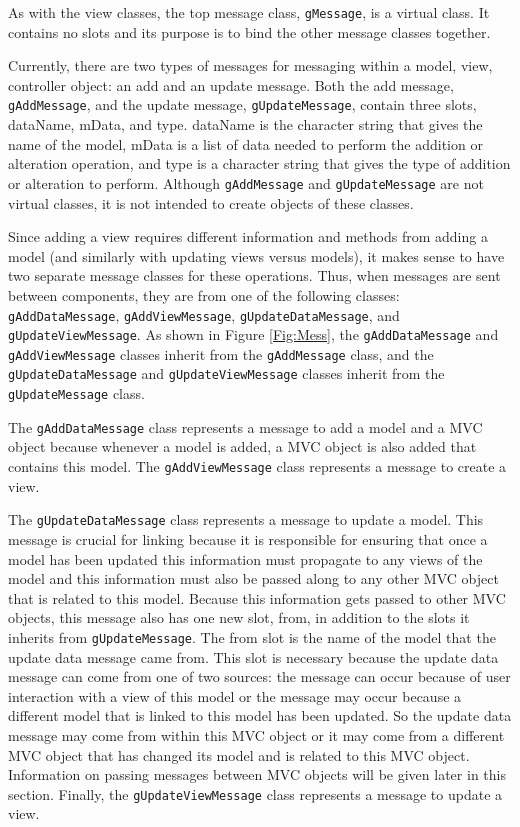 \documentclass[11pt]{article}
\newcommand{\Robject}[1]{{\texttt{#1}}}
\begin{document}
As with the view classes, the top message class, \Robject{gMessage}, is a
virtual class.  It contains no slots and its purpose is to bind the other
message classes together.

Currently, there are two types of messages for messaging within a model, view,
controller object: an add and an update message.  Both the add message,
\Robject{gAddMessage}, and the update message, \Robject{gUpdateMessage},
contain three slots, dataName, mData, and type.  dataName is the character
string that gives the name of the model, mData is a list of data needed to
perform the addition or alteration operation, and type is a character string
that gives the type of addition or alteration to perform.  Although
\Robject{gAddMessage} and \Robject{gUpdateMessage} are not virtual classes, it
is not intended to create objects of these classes.

Since adding a view requires different information and methods from adding a
model (and similarly with updating views versus models), it makes sense to
have two separate message classes for these operations.  Thus, when messages
are sent between components, they are from one of the following classes:
\Robject{gAddDataMessage}, \Robject{gAddViewMessage},
\Robject{gUpdateDataMessage}, and \Robject{gUpdateViewMessage}.  As shown in
Figure \ref{Fig:Mess}, the \Robject{gAddDataMessage} and
\Robject{gAddViewMessage} classes inherit from the \Robject{gAddMessage}
class, and the \Robject{gUpdateDataMessage} and \Robject{gUpdateViewMessage}
classes inherit from the \Robject{gUpdateMessage} class. 

The \Robject{gAddDataMessage} class represents a message to add a model and a
MVC object because whenever a model is added, a MVC object is also added that
contains this model.  The \Robject{gAddViewMessage} class represents a message
to create a view.  

The \Robject{gUpdateDataMessage} class represents a message to update
a model.  This message is crucial for linking because it is responsible for
ensuring that once a model has been updated this information must propagate to
any views of the model and this information must also be passed along to any
other MVC object that is related to this model.  Because this information gets
passed to other MVC objects, this message also has one new slot, from, in 
addition to
the slots it inherits from \Robject{gUpdateMessage}.  The from slot is the
name of the model that the update data message came from.  This slot is
necessary because the update data message can come from one of two sources:
the message can occur because of user interaction with a view
of this model or the message may occur because a different model that is
linked to this model has been updated.  So the update data message may come
from within this MVC object or it may come from a different MVC object that
has changed its model and is related to this MVC object.  
Information on passing messages between MVC
objects will be given later in this section.  Finally, the
\Robject{gUpdateViewMessage} class represents a message to update a view.
\end{document}
